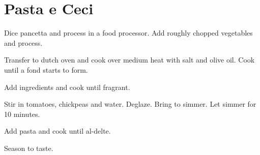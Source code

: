 \section{Pasta e Ceci}
\begin{recipe}



Dice pancetta and process in a food processor. Add roughly chopped vegetables
and process.

Transfer to dutch oven and cook over medium heat with salt and olive oil. Cook
until a fond starts to form.


Add ingredients and cook until fragrant.


Stir in tomatoes, chickpeas and water. Deglaze. Bring to simmer. Let simmer for
10 minutes.


Add pasta and cook until al-delte.


Season to taste.

\end{recipe}
